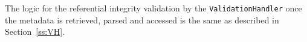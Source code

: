 The logic for the referential integrity validation by the
\texttt{ValidationHandler} once the  metadata is retrieved, parsed and accessed
is the same as described in Section~\ref{ss:VH}.

 




